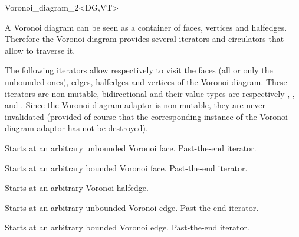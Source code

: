 \begin{ccRefClass}{Voronoi_diagram_2<DG,VT>}


A Voronoi diagram can be seen as a container of faces, vertices and
halfedges. Therefore the Voronoi diagram provides several iterators
and circulators that allow to traverse it.





The following iterators allow respectively to visit the faces (all or
only the unbounded ones), edges, halfedges and vertices of the Voronoi
diagram. These iterators are non-mutable, bidirectional and their
value types are respectively , ,
 and .
Since the Voronoi diagram adaptor is non-mutable, they are never
invalidated (provided of course that the corresponding instance of the
Voronoi diagram adaptor has not be destroyed).

\ccGlue
{}

{Starts at an arbitrary unbounded Voronoi face.}
\ccGlue
{}
{Past-the-end iterator.}

{Starts at an arbitrary bounded Voronoi face.}
\ccGlue
{}
{Past-the-end iterator.}

\ccGlue
{}

{Starts at an arbitrary Voronoi halfedge.}
\ccGlue
{}

{Starts at an arbitrary unbounded Voronoi edge.}
\ccGlue
{}
{Past-the-end iterator.}

{Starts at an arbitrary bounded Voronoi edge.}
\ccGlue
{}
{Past-the-end iterator.}


\end{ccRefClass}
